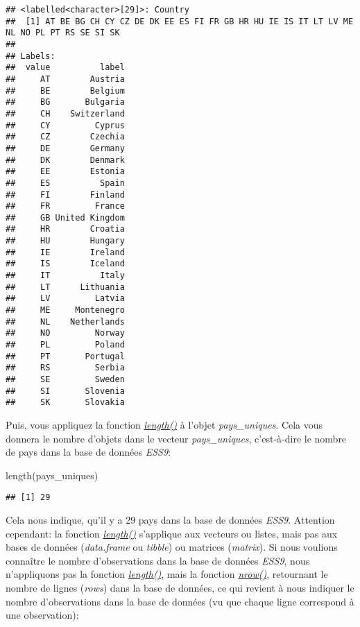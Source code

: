 \documentclass[
]{book}
\newenvironment{Shaded}{\begin{snugshade}}{\end{snugshade}}
\newcommand{\FunctionTok}[1]{\textcolor[rgb]{0.00,0.00,0.00}{#1}}
\newcommand{\NormalTok}[1]{#1}
\begin{document}
\begin{verbatim}
## <labelled<character>[29]>: Country
##  [1] AT BE BG CH CY CZ DE DK EE ES FI FR GB HR HU IE IS IT LT LV ME NL NO PL PT RS SE SI SK
## 
## Labels:
##  value          label
##     AT        Austria
##     BE        Belgium
##     BG       Bulgaria
##     CH    Switzerland
##     CY         Cyprus
##     CZ        Czechia
##     DE        Germany
##     DK        Denmark
##     EE        Estonia
##     ES          Spain
##     FI        Finland
##     FR         France
##     GB United Kingdom
##     HR        Croatia
##     HU        Hungary
##     IE        Ireland
##     IS        Iceland
##     IT          Italy
##     LT      Lithuania
##     LV         Latvia
##     ME     Montenegro
##     NL    Netherlands
##     NO         Norway
##     PL         Poland
##     PT       Portugal
##     RS         Serbia
##     SE         Sweden
##     SI       Slovenia
##     SK       Slovakia
\end{verbatim}

Puis, vous appliquez la fonction \emph{\href{https://www.rdocumentation.org/packages/base/versions/3.6.2/topics/length}{length()}} à l'objet \emph{pays\_uniques}. Cela vous donnera le nombre d'objets dans le vecteur \emph{pays\_uniques}, c'est-à-dire le nombre de pays dans la base de données \emph{ESS9}:

\begin{Shaded}
\begin{Highlighting}[]
\FunctionTok{length}\NormalTok{(pays\_uniques)}
\end{Highlighting}
\end{Shaded}

\begin{verbatim}
## [1] 29
\end{verbatim}

Cela nous indique, qu'il y a 29 pays dans la base de données \emph{ESS9}. Attention cependant: la fonction \emph{\href{https://www.rdocumentation.org/packages/base/versions/3.6.2/topics/length}{length()}} s'applique aux vecteurs ou listes, mais pas aux bases de données (\emph{data.frame} ou \emph{tibble}) ou matrices (\emph{matrix}). Si nous voulions connaître le nombre d'observations dans la base de données \emph{ESS9}, nous n'appliquons pas la fonction \emph{\href{https://www.rdocumentation.org/packages/base/versions/3.6.2/topics/length}{length()}}, mais la fonction \href{https://www.rdocumentation.org/packages/base/versions/3.6.2/topics/nrow}{\emph{nrow()}}, retournant le nombre de lignes (\emph{rows}) dans la base de données, ce qui revient à nous indiquer le nombre d'observations dans la base de données (vu que chaque ligne correspond à une observation):
\end{document}
